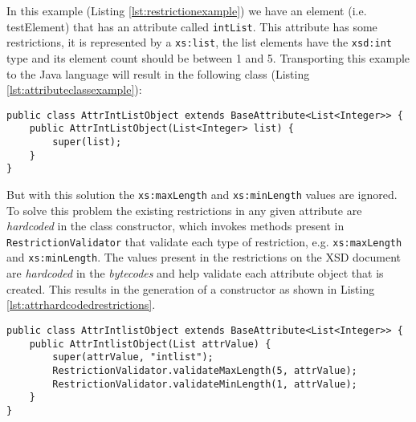 \noindent
In this example (Listing \ref{lst:restrictionexample}) we have an element (i.e. testElement) that has an attribute called \texttt{intList}. This attribute has some restrictions, it is represented by a \texttt{xs:list}, the list elements have the \texttt{xsd:int} type and its element count should be between 1 and 5. Transporting this example to the Java language will result in the following class (Listing \ref{lst:attributeclassexample}):

\bigskip


\begin{minipage}{\linewidth}
\begin{lstlisting}[caption={Attribute Class with a List as its value},captionpos=b,label={lst:attributeclassexample}]
public class AttrIntListObject extends BaseAttribute<List<Integer>> {
    public AttrIntListObject(List<Integer> list) {
        super(list);
    }
}
\end{lstlisting}
\end{minipage}

\noindent
But with this solution the \texttt{xs:maxLength} and \texttt{xs:minLength} values are ignored. To solve this problem the existing restrictions in any given attribute are \textit{hardcoded} in the class constructor, which invokes methods present in \texttt{RestrictionValidator} that validate each type of restriction, e.g. \texttt{xs:maxLength} and \texttt{xs:minLength}. The values present in the restrictions on the \ac{XSD} document are \textit{hardcoded} in the \textit{bytecodes} and help validate each attribute object that is created. This results in the generation of a constructor as shown in Listing \ref{lst:attrhardcodedrestrictions}.

\bigskip


\begin{minipage}{\linewidth}
\begin{lstlisting}[caption={Attribute Constructor Enforcing Restrictions},captionpos=b,label={lst:attrhardcodedrestrictions}]
public class AttrIntlistObject extends BaseAttribute<List<Integer>> {
    public AttrIntlistObject(List attrValue) {
        super(attrValue, "intlist");
        RestrictionValidator.validateMaxLength(5, attrValue);
        RestrictionValidator.validateMinLength(1, attrValue);
    }
}

\end{lstlisting}
\end{minipage}

